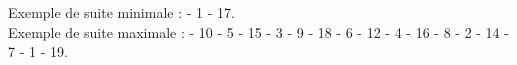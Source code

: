    Exemple de suite minimale : { - 1 - 17}. \\
Exemple de suite maximale : { - 10 - 5 - 15 - 3 - 9 - 18 - 6 - 12 - 4 - 16 - 8 - 2 - 14 - 7 - 1 - 19}.

